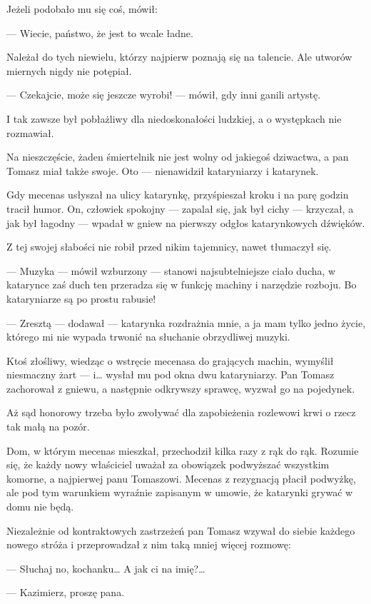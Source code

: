 Jeżeli podobało mu się coś, mówił:

— Wiecie, państwo, że jest to wcale ładne.

Należał do tych niewielu, którzy najpierw poznają się na talencie. Ale
utworów miernych nigdy nie potępiał.

— Czekajcie, może się jeszcze wyrobi! — mówił, gdy inni ganili
artystę.

I tak zawsze był pobłażliwy dla niedoskonałości ludzkiej, a o
występkach nie rozmawiał.

Na nieszczęście, żaden śmiertelnik nie jest wolny od jakiegoś
dziwactwa, a pan Tomasz miał także swoje. Oto — nienawidził
kataryniarzy i katarynek.

Gdy mecenas usłyszał na ulicy katarynkę, przyśpieszał kroku i na parę
godzin tracił humor. On, człowiek spokojny — zapalał się, jak był
cichy — krzyczał, a jak był łagodny — wpadał w gniew na pierwszy
odgłos katarynkowych dźwięków.

Z tej swojej słabości nie robił przed nikim tajemnicy, nawet tłumaczył
się.

— Muzyka — mówił wzburzony — stanowi najsubtelniejsze ciało ducha, w
katarynce zaś duch ten przeradza się w funkcję machiny i narzędzie
rozboju. Bo kataryniarze są po prostu rabusie!

— Zresztą — dodawał — katarynka rozdrażnia mnie, a ja mam tylko jedno
życie, którego mi nie wypada trwonić na słuchanie obrzydliwej muzyki.

Ktoś złośliwy, wiedząc o wstręcie mecenasa do grających machin,
wymyślił niesmaczny żart — i… wysłał mu pod okna dwu kataryniarzy. Pan
Tomasz zachorował z gniewu, a następnie odkrywszy sprawcę, wyzwał go
na pojedynek.

Aż sąd honorowy trzeba było zwoływać dla zapobieżenia rozlewowi krwi o
rzecz tak małą na pozór.

Dom, w którym mecenas mieszkał, przechodził kilka razy z rąk do
rąk. Rozumie się, że każdy nowy właściciel uważał za obowiązek
podwyższać wszystkim komorne, a najpierwej panu Tomaszowi. Mecenas z
rezygnacją płacił podwyżkę, ale pod tym warunkiem wyraźnie zapisanym w
umowie, że katarynki grywać w domu nie będą.

Niezależnie od kontraktowych zastrzeżeń pan Tomasz wzywał do siebie
każdego nowego stróża i przeprowadzał z nim taką mniej więcej rozmowę:

— Słuchaj no, kochanku… A jak ci na imię?…

— Kazimierz, proszę pana.

